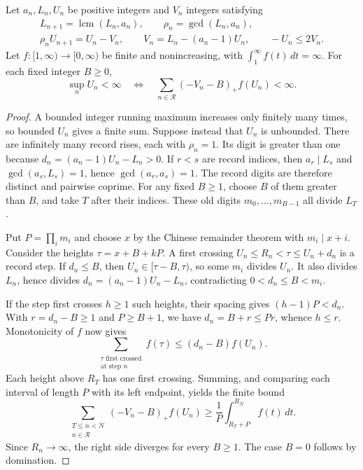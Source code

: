 \begin{theorem}\label{long243:res:arithmeticrecord}
Let $a_n,L_n,U_n$ be positive integers and $V_n$ integers satisfying
\[
 \begin{gathered}
 L_{n+1}=\operatorname{lcm}(L_n,a_n),\qquad \rho_n=\gcd(L_n,a_n),\\
 \rho_nU_{n+1}=U_n-V_n,\qquad
 V_n=L_n-(a_n-1)U_n,\qquad -U_n\le2V_n.
 \end{gathered}
\]
Let $f:[1,\infty)\to[0,\infty)$ be finite and nonincreasing, with
$\int_1^\infty f(t)\,dt=\infty$. For each fixed integer $B\ge0$,
\[
 \sup_n U_n<\infty
 \quad\Longleftrightarrow\quad
 \sum_{n\in\mathcal R}(-V_n-B)_+f(U_n)<\infty.
\]
\end{theorem}

\begin{proof}
A bounded integer running maximum increases only finitely many times, so
bounded $U_n$ gives a finite sum. Suppose instead that $U_n$ is unbounded.
There are infinitely many record rises, each with $\rho_n=1$. Its digit is
greater than one because $d_n=(a_n-1)U_n-L_n>0$. If $r<s$ are record
indices, then $a_r\mid L_s$ and $\gcd(a_s,L_s)=1$, hence
$\gcd(a_r,a_s)=1$. The record digits are therefore distinct and pairwise
coprime. For any fixed $B\ge1$, choose $B$ of them greater than $B$,
and take $T$ after their indices. These old digits
$m_0,\ldots,m_{B-1}$ all divide $L_T$.

Put $P=\prod_i m_i$ and choose $x$ by the Chinese remainder theorem with
$m_i\mid x+i$. Consider the heights $\tau=x+B+kP$. A first crossing
$U_n\le R_n<\tau\le U_n+d_n$ is a record step. If $d_n\le B$, then
$U_n\in[\tau-B,\tau)$, so some $m_i$ divides $U_n$. It also divides
$L_n$, hence divides $d_n=(a_n-1)U_n-L_n$, contradicting
$0<d_n\le B<m_i$.

If the step first crosses $h\ge1$ such heights, their spacing gives
$(h-1)P<d_n$. With $r=d_n-B\ge1$ and $P\ge B+1$, we have
$d_n=B+r\le Pr$, whence $h\le r$. Monotonicity of $f$ now gives
\[
 \sum_{\substack{\tau\text{ first crossed}\\\text{at step }n}}f(\tau)
 \le(d_n-B)f(U_n).
\]
Each height above $R_T$ has one first crossing. Summing, and comparing each
interval of length $P$ with its left endpoint, yields the finite bound
\begin{equation}\label{long243:eq:weightedcrossing}
 \sum_{\substack{T\le n<N\\n\in\mathcal R}}(-V_n-B)_+f(U_n)
 \ge\frac1P\int_{R_T+P}^{R_N} f(t)\,dt.
\end{equation}
Since $R_n\to\infty$, the right side diverges for every $B\ge1$.
The case $B=0$ follows by domination.
\end{proof}

